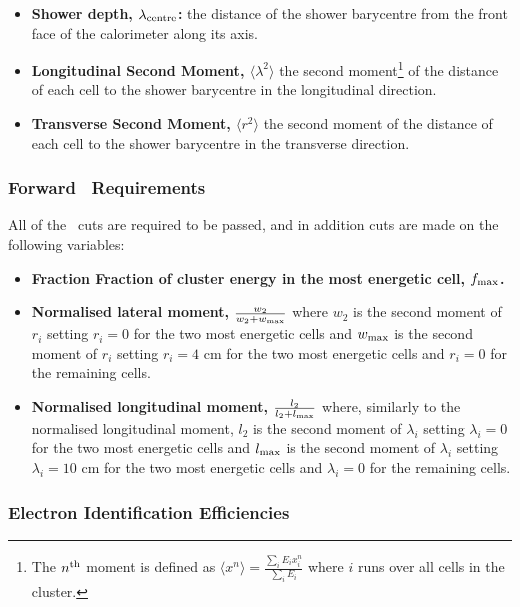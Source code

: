 \begin{itemize}
    \item {\bf Shower depth, $\lambda_{\rm centre}$:} the distance of the shower
    barycentre from the front face of the calorimeter along its axis.  
    \item {\bf Longitudinal Second Moment, $\langle \lambda^2 \rangle$} the second
    moment\footnote{The $n^{\rm th}$ moment is defined as $\langle x^n \rangle =
    \frac{\sum_{i} E_i x^n_i}{\sum_{i} E_i}$ where $i$ runs over all cells in the
    cluster.} of the distance of each cell to
    the shower barycentre in the longitudinal direction.  
    \item {\bf Transverse Second Moment, $\langle r^2 \rangle$} the second moment of the 
    distance of each cell to the shower barycentre in the transverse direction.
\end{itemize}

\subsubsection{Forward \tight\ Requirements}

All of the \loose\ cuts are required to be passed, and in addition cuts are made
on the following variables:

\begin{itemize}
    \item {\bf Fraction Fraction of cluster energy in the most energetic cell,
    $f_{\rm max}$.}
    \item {\bf Normalised lateral moment, $\frac{w_{2}}{w_{2} + w_{\rm max}}$} where
    $w_{2}$ is the second moment of $r_{i}$ setting $r_{i} = 0$ for the two most
    energetic cells and $w_{\rm max}$ is the second moment of $r_{i}$ setting
    $r_{i} = 4$ cm for the two most energetic cells and $r_{i} = 0$ for the
    remaining cells.
    \item {\bf Normalised longitudinal moment, $\frac{l_{2}}{l_{2} + l_{\rm
    max}}$}
    where, similarly to the normalised longitudinal moment, 
    $l_{2}$ is the second moment of $\lambda_{i}$ setting $\lambda_{i} = 0$ for the two most
    energetic cells and $l_{\rm max}$ is the second moment of $\lambda_{i}$ setting
    $\lambda_{i} = 10$ cm for the two most energetic cells and $\lambda_{i} = 0$ for the
    remaining cells.
\end{itemize}

\subsubsection{Electron Identification Efficiencies}


